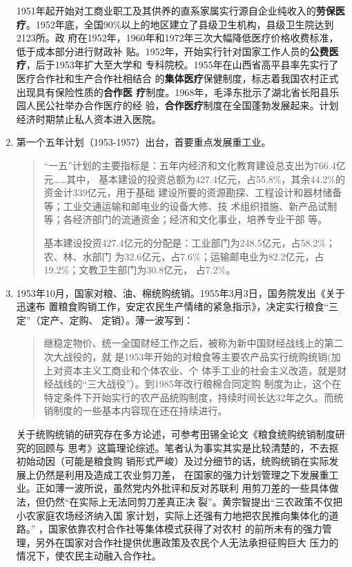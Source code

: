 \begin{enumerate}
  1951年起开始对工商业职工及其供养的直系家属实行源自企业纯收入的\textbf{劳保医
    疗}。1952年底，全国90\%以上的地区建立了县级卫生机构，县级卫生院达到2123所。政
  府在1952年，1960年和1972年三次大幅降低医疗价格收费标准，低于成本部分进行财政补
  贴。1952年，开始实行针对国家工作人员的\textbf{公费医疗}，后于1953年扩大至大学和
  专科院校。1955年在山西省高平县率先实行了医疗合作社和生产合作社相结合
  的\textbf{集体医疗}保健制度，标志着我国农村正式出现具有保险性质的\textbf{合作医
    疗}制度。1968年，毛泽东批示了湖北省长阳县乐园人民公社举办合作医疗的经
  验，\textbf{合作医疗}制度在全国蓬勃发展起来。计划经济时期禁止私人资本进入医院。


\item 第一个五年计划（1953-1957）出台，首要重点发展重工业。
  \begin{quotation}
    ``一五''计划的主要指标是：五年内经济和文化教育建设总支出为766.4亿元……其中，
    基本建设的投资总额为427.4亿元，占55.8\%，其余44.2\%的资金计339亿元，用于基础
    建设所要的资源勘探、工程设计和器材储备等；工业交通运输和邮电业的设备大修、技
    术组织措施、新产品试制等；各经济部门的流通资金；经济和文化事业，培养专业干部
    等。

    基本建设投资427.4亿元的分配是：工业部门为248.5亿元，占58.2\%；农、林、水部门
    为32.6亿元，占7.6\%；运输邮电业为82.2亿元，占19.2\%；文教卫生部门为30.8亿元，
    占7.2\%。
  \end{quotation}

\item 1953年10月，国家对粮、油、棉统购统销。1955年3月3日，国务院发出《关于迅速布
  置粮食购销工作，安定农民生产情绪的紧急指示》，决定实行粮食``三定''（定产、定购、
  定销）。薄一波写到：
  \begin{quotation}
    继稳定物价、统一全国财经工作之后，被称为新中国财经战线上的第二次大战役的，就
    是1953年开始的对粮食等主要农产品实行统购统销(加上对资本主义工商业和个体农业、个
    体手工业的社会主义改造，就是财经战线的``三大战役''）。到1985年改行粮棉合同定购
    制度为止，这个在特定条件下开始实行的农产品统购制度，持续时间长达32年之久。而统
    销制度的一些基本内容现在还在持续进行。
  \end{quotation}

  关于统购统销的研究存在多方论述，可参考田锡全论文《粮食统购统销制度研究的回顾与
  思考》这篇理论综述。笔者认为事实其实是比较清楚的，不去抠初始动因（可能是粮食购
  销形式严峻）及过分细节的话，统购统销在实际发展上仍然是利用及造成工农业剪刀差，
  在国家的强力计划管理之下发展重工业。正如薄一波所说，虽然党内外批评和反对苏联利
  用剪刀差的一些具体做法，但仍然``在实际上无法同剪刀差真正决
  裂''。黄宗智提出``三农政策不仅把小农家庭农场经济纳入国
  家计划，实际上还强有力地把农民推向集体化的道
  路。'' ，国家依靠农村合作社等集体模式获得了对农村
  的前所未有的强力管理，另外在国家对合作社提供优惠政策及农民个人无法承担征购巨大
  压力的情况下，使农民主动融入合作社。


\end{enumerate}
